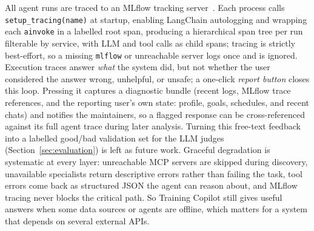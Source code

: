 All agent runs are traced to an MLflow tracking server~\citep{mlflow_multiturn_2025}. Each process calls \texttt{setup\_tracing(name)} at startup, enabling LangChain autologging and wrapping each \texttt{ainvoke} in a labelled root span, producing a hierarchical span tree per run filterable by service, with LLM and tool calls as child spans; tracing is strictly best-effort, so a missing \texttt{mlflow} or unreachable server logs once and is ignored. Execution traces answer \textit{what} the system did, but not whether the user considered the answer wrong, unhelpful, or unsafe; a one-click \textit{report button} closes this loop. Pressing it captures a diagnostic bundle (recent logs, MLflow trace references, and the reporting user's own state: profile, goals, schedules, and recent chats) and notifies the maintainers, so a flagged response can be cross-referenced against its full agent trace during later analysis. Turning this free-text feedback into a labelled good/bad validation set for the LLM judges (Section~\ref{sec:evaluation}) is left as future work. Graceful degradation is systematic at every layer: unreachable MCP servers are skipped during discovery, unavailable specialists return descriptive errors rather than failing the task, tool errors come back as structured JSON the agent can reason about, and MLflow tracing never blocks the critical path. So Training Copilot still gives useful answers when some data sources or agents are offline, which matters for a system that depends on several external APIs.
